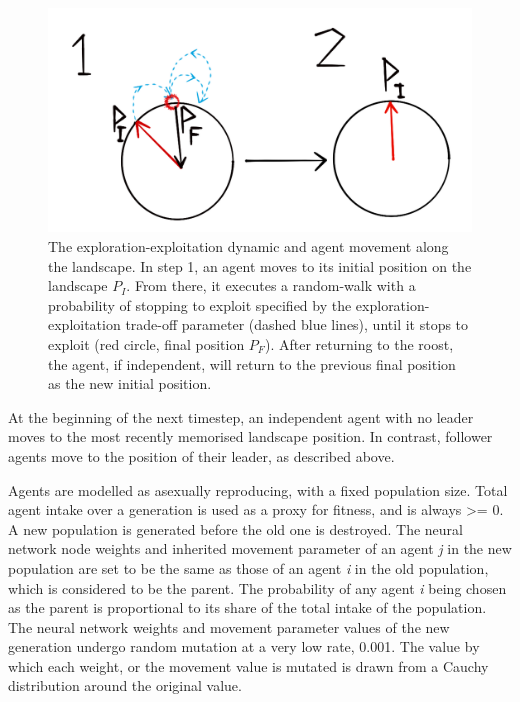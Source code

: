 \begin{figure}
\centering
\includegraphics{fig_circmove.png}
\caption{The exploration-exploitation dynamic and agent movement along
the landscape. In step 1, an agent moves to its initial position on the
landscape \(P_I\). From there, it executes a random-walk with a
probability of stopping to exploit specified by the
exploration-exploitation trade-off parameter (dashed blue lines), until
it stops to exploit (red circle, final position \(P_F\)). After
returning to the roost, the agent, if independent, will return to the
previous final position as the new initial position.}
\end{figure}

At the beginning of the next timestep, an independent agent with no
leader moves to the most recently memorised landscape position. In
contrast, follower agents move to the position of their leader, as
described above.

Agents are modelled as asexually reproducing, with a fixed population
size. Total agent intake over a generation is used as a proxy for
fitness, and is always \textgreater{}= 0. A new population is generated
before the old one is destroyed. The neural network node weights and
inherited movement parameter of an agent \emph{j} in the new population
are set to be the same as those of an agent \emph{i} in the old
population, which is considered to be the parent. The probability of any
agent \emph{i} being chosen as the parent is proportional to its share
of the total intake of the population. The neural network weights and
movement parameter values of the new generation undergo random mutation
at a very low rate, 0.001. The value by which each weight, or the
movement value is mutated is drawn from a Cauchy distribution around the
original value.

